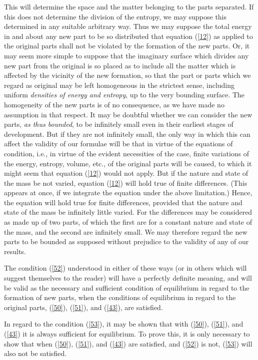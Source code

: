 \documentclass[12pt]{article}
\begin{document}
This will determine the space and the matter belonging to the parts separated. If this does not determine the division of the entropy, we may suppose this determined in any suitable arbitrary way. Thus we may suppose the total energy in and about any new part to be so distributed that equation (\ref{12}) as applied to the original parts shall not be violated by the formation of the new parts. Or, it may seem more simple to suppose that the imaginary surface which divides any new part from the original is so placed as to include all the matter which is affected by the vicinity of the new formation, so that the part or parts which we regard as original may be left homogeneous in the strictest sense, including uniform \textit{densities of energy and entropy}, up to the very bounding surface. The homogeneity of the new parts is of no consequence, as we have made no assumption in that respect. It may be doubtful whether we can consider the new parts, \textit{as thus bounded}, to be infinitely small even in their earliest stages of development. But if they are not infinitely small, the only way in which this can affect the validity of our formulae will be that in virtue of the equations of condition, i.e., in virtue of the evident necessities of the case, finite variations of the energy, entropy, volume, etc., of the original parts will be caused, to which it might seem that equation (\ref{12}) would not apply. But if the nature and state of the mass be not varied, equation (\ref{12}) will hold true of finite differences. (This appears at once, if we integrate the equation under the above limitation.) Hence, the equation will hold true for finite differences, provided that the nature and state of the mass be infinitely little varied. For the differences may be considered as made up of two parts, of which the first are for a constant nature and state of the mass, and the second are infinitely small. We may therefore regard the new parts to be bounded as supposed without prejudice to the validity of any of our results.


The condition (\ref{52}) understood in either of these ways (or in others which will suggest themselves to the reader) will have a perfectly definite meaning, and will be valid as the necessary and sufficient condition of equilibrium in regard to the formation of new parts, when the conditions of equilibrium in regard to the original parts, (\ref{50}), (\ref{51}), and (\ref{43}), are satisfied.


In regard to the condition (\ref{53}), it may be shown that with (\ref{50}), (\ref{51}), and (\ref{43}) it is always sufficient for equilibrium. To prove this, it is only necessary to show that when (\ref{50}), (\ref{51}), and (\ref{43}) are satisfied, and (\ref{52}) is not, (\ref{53}) will also not be satisfied.
\end{document}
